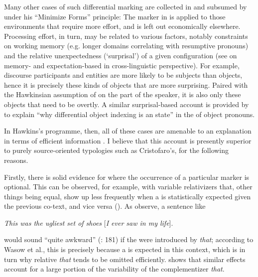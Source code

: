 \documentclass[output=paper]{langsci/langscibook}
\begin{document}
Many other cases of such differential marking are collected in \citet{Haspelmath2008_Econ} and subsumed by \citet{Hawkins2004_Eff,Hawkins2014_VarEff} under his “Minimize Forms” principle: The marker in  is applied to those environments that require more  effort, and is left out economically elsewhere. Processing effort, in turn, may be related to various factors, notably constraints on working memory (e.g. longer  domains correlating with resumptive pronouns) and the relative unexpectedness (‘surprisal’) of a given configuration (see \citealt{NorcliffeEtAl2015} on memory- and expectation-based  in cross-linguistic perspective). For example, discourse participants and  entities are more likely to be subjects than objects, hence it is precisely these kinds of objects that are more surprising. Paired with the Hawkinsian assumption of  on the part of the speaker, it is also only these objects that need to be  overtly. A similar surprisal-based account is provided by \citet{Haig2018_DOI} to explain “why differential object indexing is an  state” \citep[781]{Haig2018_DOI} in the  of object pronouns.

In Hawkins’s programme, then, all of these cases are amenable to an explanation in terms of efficient information . I believe that this account is presently superior to purely source-oriented typologies such as Cristofaro’s, for the following reasons.

Firstly, there is solid evidence for  where the occurrence of a particular marker is optional. This can be observed, for example, with variable relativizers that, other things being equal, show up less frequently when a  is statistically expected given the previous co-text, and vice versa (\citealt{WasowEtAl2011}). As \citet{FoxThompson2007} observe, a sentence like

\ea
{\textit{This was the ugliest set of shoes} [\textit{I ever saw in my life}].} \\
\z

\noindent would sound “quite awkward” (\citealt{WasowEtAl2011}: 181) if the  were introduced by \textit{that}; according to Wasow et al., this is precisely because a  is expected in this context, which is in turn why relative \textit{that} tends to be omitted efficiently. \citet{Jaeger2010_Red} shows that similar  effects account for a large portion of the variability of the  complementizer \textit{that}. 
\end{document}
